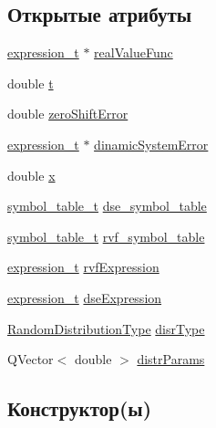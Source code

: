 \subsection*{Открытые атрибуты}
\begin{DoxyCompactItemize}
\item 
\hyperlink{reggenerator_8h_af27600befe001c40c3fe341f6fafc956}{expression\+\_\+t} $\ast$ \hyperlink{class_value_generator_a21e9233dcdb75f070222804036d81633}{real\+Value\+Func}
\item 
double \hyperlink{class_value_generator_ae5704d08c0d77db9b56a23f94aba349e}{t}
\item 
double \hyperlink{class_value_generator_aa8d483dc1342dcb2b6302d6e0b680bfa}{zero\+Shift\+Error}
\item 
\hyperlink{reggenerator_8h_af27600befe001c40c3fe341f6fafc956}{expression\+\_\+t} $\ast$ \hyperlink{class_value_generator_ac6113fdaf5766febc4900b2043c07f95}{dinamic\+System\+Error}
\item 
double \hyperlink{class_value_generator_a29306396cd47ae72e36c29781ec9d60d}{x}
\item 
\hyperlink{reggenerator_8h_a5b17130e77047ba058dcea28131d0161}{symbol\+\_\+table\+\_\+t} \hyperlink{class_value_generator_a209d074a5826a8ec538bde5eacb93e9f}{dse\+\_\+symbol\+\_\+table}
\item 
\hyperlink{reggenerator_8h_a5b17130e77047ba058dcea28131d0161}{symbol\+\_\+table\+\_\+t} \hyperlink{class_value_generator_ac1d89bee10f5a353719de259fb06b63a}{rvf\+\_\+symbol\+\_\+table}
\item 
\hyperlink{reggenerator_8h_af27600befe001c40c3fe341f6fafc956}{expression\+\_\+t} \hyperlink{class_value_generator_a5729b430bda314334d2de8160699e26f}{rvf\+Expression}
\item 
\hyperlink{reggenerator_8h_af27600befe001c40c3fe341f6fafc956}{expression\+\_\+t} \hyperlink{class_value_generator_a02064f0d352a2b3e0358c6e02c521413}{dse\+Expression}
\item 
\hyperlink{_random_types_8h_ad7b55c73a22b009b1551ea87b0955a60}{Random\+Distribution\+Type} \hyperlink{class_value_generator_a876b8fbdbf50aa645995ffb9b8305696}{disr\+Type}
\item 
Q\+Vector$<$ double $>$ \hyperlink{class_value_generator_a3fe2f55de9b617fdec635bca5518c027}{distr\+Params}
\end{DoxyCompactItemize}


\subsection{Конструктор(ы)}
\mbox{\label{class_value_generator_a537f79ef495f29177ead85663747b249}} 

